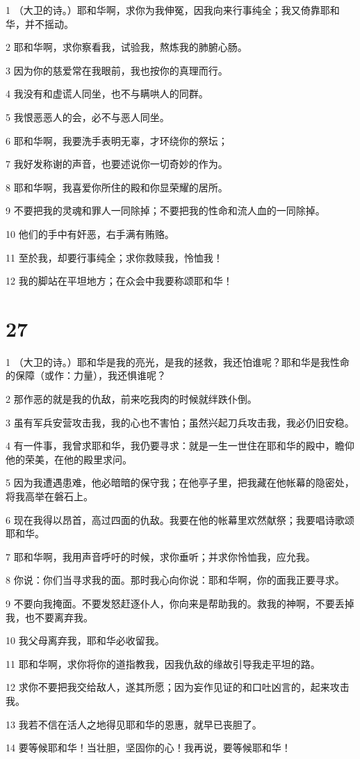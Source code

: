 \par 1 （大卫的诗。）耶和华啊，求你为我伸冤，因我向来行事纯全；我又倚靠耶和华，并不摇动。
\par 2 耶和华啊，求你察看我，试验我，熬炼我的肺腑心肠。
\par 3 因为你的慈爱常在我眼前，我也按你的真理而行。
\par 4 我没有和虚谎人同坐，也不与瞒哄人的同群。
\par 5 我恨恶恶人的会，必不与恶人同坐。
\par 6 耶和华啊，我要洗手表明无辜，才环绕你的祭坛；
\par 7 我好发称谢的声音，也要述说你一切奇妙的作为。
\par 8 耶和华啊，我喜爱你所住的殿和你显荣耀的居所。
\par 9 不要把我的灵魂和罪人一同除掉；不要把我的性命和流人血的一同除掉。
\par 10 他们的手中有奸恶，右手满有贿赂。
\par 11 至於我，却要行事纯全；求你救赎我，怜恤我！
\par 12 我的脚站在平坦地方；在众会中我要称颂耶和华！

\chapter{27}

\par 1 （大卫的诗。）耶和华是我的亮光，是我的拯救，我还怕谁呢？耶和华是我性命的保障（或作：力量），我还惧谁呢？
\par 2 那作恶的就是我的仇敌，前来吃我肉的时候就绊跌仆倒。
\par 3 虽有军兵安营攻击我，我的心也不害怕；虽然兴起刀兵攻击我，我必仍旧安稳。
\par 4 有一件事，我曾求耶和华，我仍要寻求：就是一生一世住在耶和华的殿中，瞻仰他的荣美，在他的殿里求问。
\par 5 因为我遭遇患难，他必暗暗的保守我；在他亭子里，把我藏在他帐幕的隐密处，将我高举在磐石上。
\par 6 现在我得以昂首，高过四面的仇敌。我要在他的帐幕里欢然献祭；我要唱诗歌颂耶和华。
\par 7 耶和华啊，我用声音呼吁的时候，求你垂听；并求你怜恤我，应允我。
\par 8 你说：你们当寻求我的面。那时我心向你说：耶和华啊，你的面我正要寻求。
\par 9 不要向我掩面。不要发怒赶逐仆人，你向来是帮助我的。救我的神啊，不要丢掉我，也不要离弃我。
\par 10 我父母离弃我，耶和华必收留我。
\par 11 耶和华啊，求你将你的道指教我，因我仇敌的缘故引导我走平坦的路。
\par 12 求你不要把我交给敌人，遂其所愿；因为妄作见证的和口吐凶言的，起来攻击我。
\par 13 我若不信在活人之地得见耶和华的恩惠，就早已丧胆了。
\par 14 要等候耶和华！当壮胆，坚固你的心！我再说，要等候耶和华！

